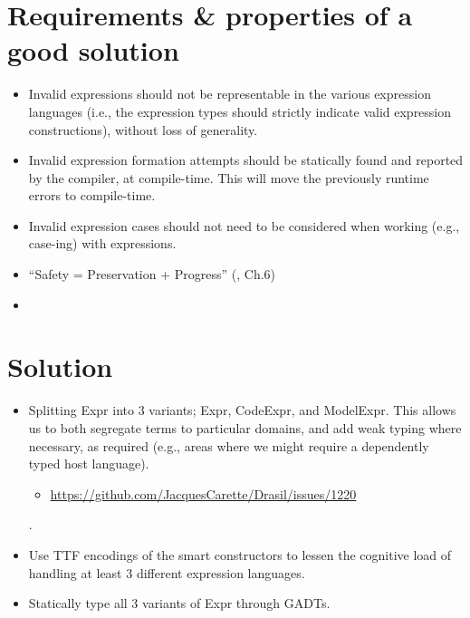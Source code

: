 \section{Requirements \& properties of a good solution}

\begin{itemize}

      \item Invalid expressions should not be representable in the various
            expression languages (i.e., the expression types should strictly
            indicate valid expression constructions), without loss of
            generality.

      \item Invalid expression formation attempts should be statically found and
            reported by the compiler, at compile-time. This will move the
            previously runtime errors to compile-time.

      \item Invalid expression cases should not need to be considered when working
            (e.g., case-ing) with expressions.

      \item ``Safety = Preservation + Progress'' (\cite{Harper2016}, Ch.6)

      \item {}

\end{itemize}

\section{Solution}

\begin{itemize}

      \item Splitting Expr into 3 variants; Expr, CodeExpr, and ModelExpr.
            This allows us to both segregate terms to particular domains, and add
            weak typing where necessary, as required (e.g., areas where we might
            require a dependently typed host language).

            \begin{itemize}
            
                  \item \url{https://github.com/JacquesCarette/Drasil/issues/1220}
            
            \end{itemize}

            .

      \item Use TTF encodings of the smart constructors to lessen the cognitive
            load of handling at least 3 different expression languages.

      \item Statically type all 3 variants of Expr through GADTs.

\end{itemize}

